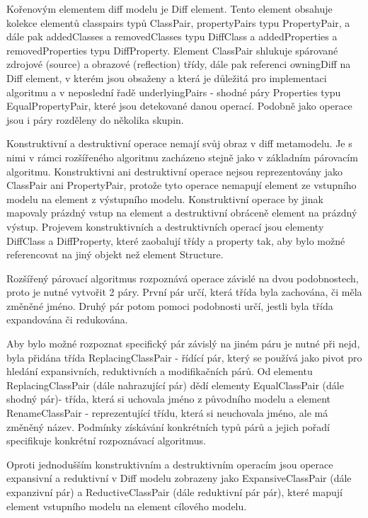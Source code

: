 \documentclass[11pt,twoside,a4paper]{book}
\begin{document}
 Kořenovým elementem diff modelu je Diff element. Tento element obsahuje
 kolekce elementů classpairs typů ClassPair, propertyPairs typu PropertyPair, a
 dále pak addedClasses a removedClasses typu DiffClass a addedProperties a
 removedProperties typu DiffProperty. Element ClassPair shlukuje spárované
 zdrojové (source) a obrazové (reflection) třídy, dále pak referenci owningDiff
 na Diff element, v kterém jsou obsaženy a která je důležitá pro implementaci
 algoritmu a v neposlední řadě underlyingPairs - shodné páry Properties typu
 EqualPropertyPair, které jsou detekované danou operací. Podobně jako operace
 jsou i páry rozděleny do několika skupin.
 
 Konstruktivní a destruktivní operace nemají svůj obraz v diff metamodelu. Je s
 nimi v rámci rozšířeného algoritmu zacházeno stejně jako v základním párovacím
 algoritmu.
 Konstruktivni ani destruktivní operace nejsou reprezentovány jako ClassPair ani
 PropertyPair, protože tyto operace nemapují element ze vstupního modelu na
 element z výstupního modelu.
 Konstruktivní operace by jinak mapovaly prázdný vstup na element a
 destruktivní obráceně element na prázdný výstup.
 Projevem konstruktivních a destruktivních operací jsou elementy DiffClass a
 DiffProperty, které zaobalují třídy a property tak, aby bylo možné referencovat
 na jiný objekt než element Structure. 

 Rozšířený párovací algoritmus rozpoznává operace závislé na dvou podobnostech,
 proto je nutné vytvořit 2 páry. První pár určí, která třída byla zachována, či
 měla změněné jméno. Druhý pár potom pomoci podobnosti určí, jestli byla třída
 expandována či redukována.
 
 Aby bylo možné rozpoznat specifický pár závislý na jiném páru je nutné při
 nejd, byla přidána třída ReplacingClassPair - řídící pár, který se
 používá jako pivot pro hledání expansivních, reduktivních a modifikačních
 párů. Od elementu ReplacingClassPair (dále nahrazující pár) dědí elementy
 EqualClassPair (dále shodný pár)- třída, která si uchovala jméno z původního
 modelu a element RenameClassPair - reprezentující třídu, která si
 neuchovala jméno, ale má změněný název.
 Podmínky získávání konkrétních typů párů a jejich pořadí specifikuje konkrétní
 rozpoznávací algoritmus.
 
 Oproti jednodušším konstruktivním a destruktivním operacím jsou operace
 expansivní a reduktivní v Diff modelu zobrazeny jako
 ExpansiveClassPair (dále expanzivní pár) a ReductiveClassPair (dále reduktivní
 pár pár), které mapují element vstupního modelu na element cílového modelu. 
 
\end{document}
